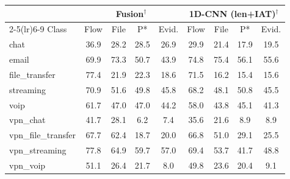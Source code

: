 \begin{tabular}{lcccccccc}
\toprule
 & \multicolumn{4}{c}{Fusion$^\dagger$} & \multicolumn{4}{c}{1D-CNN (len+IAT)$^\dagger$} \\
\cmidrule(lr){2-5}\cmidrule(lr){6-9}
Class & Flow & File & P* & Evid. & Flow & File & P* & Evid. \\
\midrule
chat & 36.9 & 28.2 & 28.5 & 26.9 & 29.9 & 21.4 & 17.9 & 19.5 \\
email & 69.9 & 73.3 & 50.7 & 43.9 & 74.8 & 75.4 & 56.1 & 55.6 \\
file\_transfer & 77.4 & 21.9 & 22.3 & 18.6 & 71.5 & 16.2 & 15.4 & 15.6 \\
streaming & 70.9 & 51.6 & 49.8 & 45.8 & 68.2 & 48.1 & 50.8 & 45.5 \\
voip & 61.7 & 47.0 & 47.0 & 44.2 & 58.0 & 43.8 & 45.1 & 41.3 \\
vpn\_chat & 41.7 & 28.1 & 6.2 & 7.4 & 35.6 & 21.6 & 8.9 & 8.9 \\
vpn\_file\_transfer & 67.7 & 62.4 & 18.7 & 20.0 & 66.8 & 51.0 & 29.1 & 25.5 \\
vpn\_streaming & 77.8 & 64.9 & 59.7 & 57.0 & 69.4 & 53.7 & 41.7 & 48.8 \\
vpn\_voip & 51.1 & 26.4 & 21.7 & 8.0 & 49.8 & 23.6 & 20.4 & 9.1 \\
\bottomrule
\end{tabular}
